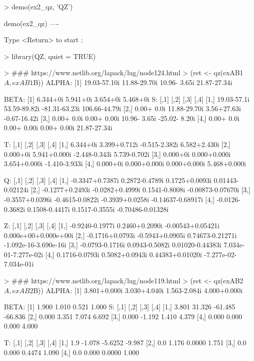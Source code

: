 \begin{Code}[title=QZ demo ex2\_qz]
> demo(ex2_qz, 'QZ')


	demo(ex2_qz)
	---- ~~~~~~

Type  <Return>	 to start : 

> library(QZ, quiet = TRUE)

> ### https://www.netlib.org/lapack/lug/node124.html
> (ret <- qz(exAB1$A, exAB1$B))
ALPHA:
[1] 19.03-57.10i 11.88-29.70i 10.96- 3.65i 21.87-27.34i

BETA:
[1] 6.344+0i 5.941+0i 3.654+0i 5.468+0i
S:
            [,1]         [,2]          [,3]          [,4]
[1,] 19.03-57.1i 53.59-89.82i -81.31-63.23i 106.66-44.79i
[2,]  0.00+ 0.0i 11.88-29.70i   3.56+27.63i  -0.67-16.42i
[3,]  0.00+ 0.0i  0.00+ 0.00i  10.96- 3.65i -25.02- 8.20i
[4,]  0.00+ 0.0i  0.00+ 0.00i   0.00+ 0.00i  21.87-27.34i

T:
         [,1]         [,2]          [,3]          [,4]
[1,] 6.344+0i 3.399+0.712i -0.515-2.382i  6.582+2.430i
[2,] 0.000+0i 5.941+0.000i -2.448-0.343i  5.739-0.702i
[3,] 0.000+0i 0.000+0.000i  3.654+0.000i -1.410-3.933i
[4,] 0.000+0i 0.000+0.000i  0.000+0.000i  5.468+0.000i

Q:
                [,1]            [,2]            [,3]              [,4]
[1,] -0.3347+0.7387i  0.2872-0.4789i  0.1725+0.0093i  0.01443-0.02124i
[2,] -0.1277+0.2493i -0.0282+0.4999i  0.1541-0.8008i -0.00873-0.07670i
[3,] -0.3557+0.0396i -0.4615-0.0822i -0.3939+0.0258i -0.14637-0.68917i
[4,] -0.0126-0.3682i  0.1508-0.4417i  0.1517-0.3555i -0.70486-0.01328i

Z:
                [,1]            [,2]              [,3]                  [,4]
[1,] -0.9240-0.1977i  0.2460+0.2090i -0.00543+0.05421i  0.000e+00+0.000e+00i
[2,] -0.1716+0.0793i -0.5943+0.0905i  0.74673-0.21271i -1.092e-16-3.690e-16i
[3,] -0.0793-0.1716i  0.0943-0.5082i  0.01020-0.44383i  7.034e-01-7.277e-02i
[4,]  0.1716-0.0793i  0.5082+0.0943i  0.44383+0.01020i -7.277e-02-7.034e-01i

> ### https://www.netlib.org/lapack/lug/node119.html
> (ret <- qz(exAB2$A, exAB2$B))
ALPHA:
[1] 3.801+0.000i 3.030+4.040i 1.563-2.084i 4.000+0.000i

BETA:
[1] 1.900 1.010 0.521 1.000
S:
      [,1]   [,2]    [,3]    [,4]
[1,] 3.801 31.326 -61.485 -66.836
[2,] 0.000  3.351   7.074   6.692
[3,] 0.000 -1.192   1.410   4.379
[4,] 0.000  0.000   0.000   4.000

T:
     [,1]   [,2]    [,3]   [,4]
[1,]  1.9 -1.078 -5.6252 -9.987
[2,]  0.0  1.176  0.0000  1.751
[3,]  0.0  0.000  0.4474  1.090
[4,]  0.0  0.000  0.0000  1.000


\end{Code}
